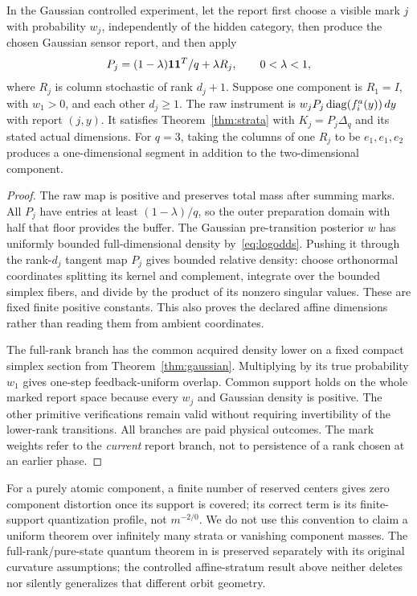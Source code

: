 \begin{corollary}\label{cor:rank-raw}
In the Gaussian controlled experiment, let the report first choose a visible mark $j$ with probability $w_j$, independently of the hidden category, then produce the chosen Gaussian sensor report, and then apply
\[
 P_j=(1-\lambda)\mathbf 1\mathbf 1^T/q+\lambda R_j,
 \qquad 0<\lambda<1,
\]
where $R_j$ is column stochastic of rank $d_j+1$. Suppose one component is $R_1=I$, with $w_1>0$, and each other $d_j\ge1$. The raw instrument is
$w_jP_j\operatorname{diag}(f_i^a(y))\,dy$ with report $(j,y)$. It satisfies Theorem~\ref{thm:strata} with $K_j=P_j\Delta_q$ and its stated actual dimensions. For $q=3$, taking the columns of one $R_j$ to be $e_1,e_1,e_2$ produces a one-dimensional segment in addition to the two-dimensional component.
\end{corollary}
\begin{proof}
The raw map is positive and preserves total mass after summing marks. All $P_j$ have entries at least $(1-\lambda)/q$, so the outer preparation domain with half that floor provides the buffer. The Gaussian pre-transition posterior $w$ has uniformly bounded full-dimensional density by~\eqref{eq:logodds}. Pushing it through the rank-$d_j$ tangent map $P_j$ gives bounded relative density: choose orthonormal coordinates splitting its kernel and complement, integrate over the bounded simplex fibers, and divide by the product of its nonzero singular values. These are fixed finite positive constants. This also proves the declared affine dimensions rather than reading them from ambient coordinates.

The full-rank branch has the common acquired density lower on a fixed compact simplex section from Theorem~\ref{thm:gaussian}. Multiplying by its true probability $w_1$ gives one-step feedback-uniform overlap. Common support holds on the whole marked report space because every $w_j$ and Gaussian density is positive. The other primitive verifications remain valid without requiring invertibility of the lower-rank transitions. All branches are paid physical outcomes. The mark weights refer to the \emph{current} report branch, not to persistence of a rank chosen at an earlier phase.
\end{proof}

For a purely atomic component, a finite number of reserved centers gives zero component distortion once its support is covered; its correct term is its finite-support quantization profile, not $m^{-2/0}$. We do not use this convention to claim a uniform theorem over infinitely many strata or vanishing component masses. The full-rank/pure-state quantum theorem in \cite{GTFBayes} is preserved separately with its original curvature assumptions; the controlled affine-stratum result above neither deletes nor silently generalizes that different orbit geometry.
